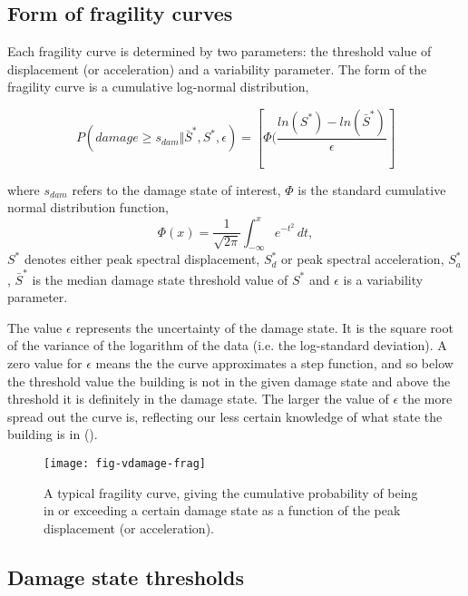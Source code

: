 \subsection{Form of fragility curves}

Each fragility curve is determined by two
parameters: the threshold value of displacement (or acceleration)
and a variability parameter. The form of the fragility
curve is a cumulative log-normal
distribution,

\begin{equation}
\label{eq:vdamage-frag} 
P(damage \ge s_{dam} \Vert \bar S^*,S^*,\epsilon) =
[\Phi(\frac{ln(S^*) - ln(\bar S^*)}{\epsilon}]
\end{equation}


where $s_{dam}$ refers to the damage state of interest, $\Phi$ is
the standard cumulative normal distribution function,
$$
 \Phi(x) = \frac{1}{\sqrt{2\pi}}\int_{-\infty}^x e^{-t^2}\,dt,
$$
$S^*$ denotes either peak spectral displacement, $S_d^*$ or peak spectral acceleration,
$S_a^*$, $\bar S^*$ is the median damage state threshold value of
$S^*$ and $\epsilon$ is a variability parameter.

The value $\epsilon$ represents the uncertainty of the damage
state. It is the square root of the variance of the logarithm of
the data (i.e. the log-standard deviation). A zero value for
$\epsilon$ means the the curve approximates a step function, and
so below the threshold value the building is not in the given
damage state and above the threshold it is definitely in the
damage state. The larger the value of $\epsilon$ the more spread
out the curve is, reflecting our less certain knowledge of what
state the building is in ().


\begin{figure}[htp]
\label{fig:dam-fragility-var-dstate} \centering
{}
 
\texttt{[image: fig-vdamage-frag]}
\caption{A typical fragility curve, giving
the cumulative probability of
  being in or exceeding
  a certain damage state as a function of the
 peak displacement (or acceleration).}
\label{fig:vdamage-frag}
\end{figure}

\subsection{Damage state thresholds}

